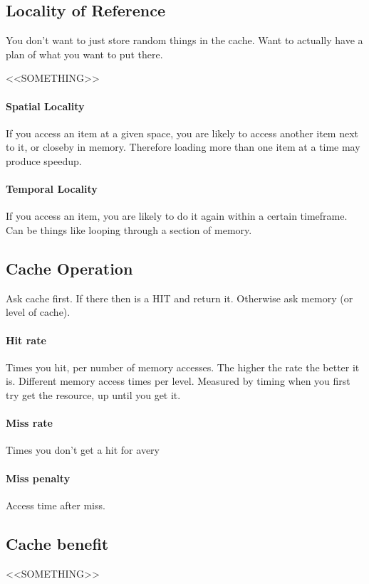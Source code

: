 \documentclass{article}
\begin{document}
	\subsection*{Locality of Reference}
		You don't want to just store random things in the cache. Want to actually have a plan of what you want to put there.

		<<SOMETHING>>

		\paragraph{Spatial Locality}
		If you access an item at a given space, you are likely to access another item next to it, or closeby in memory. Therefore loading more than one item at a time may produce speedup. 

		\paragraph{Temporal Locality}
		If you access an item, you are likely to do it again within a certain timeframe. Can be things like looping through a section of memory.

	\subsection*{Cache Operation}
		Ask cache first. If there then is a HIT and return it. Otherwise ask memory (or level of cache).

		\paragraph{Hit rate}
		Times you hit, per number of memory accesses. The higher the rate the better it is. Different memory access times per level. Measured by timing when you first try get the resource, up until you get it.

		\paragraph{Miss rate}
		Times you don't get a hit for avery 

		\paragraph{Miss penalty}
		Access time after miss.

	\subsection*{Cache benefit}
		<<SOMETHING>>
\end{document}
